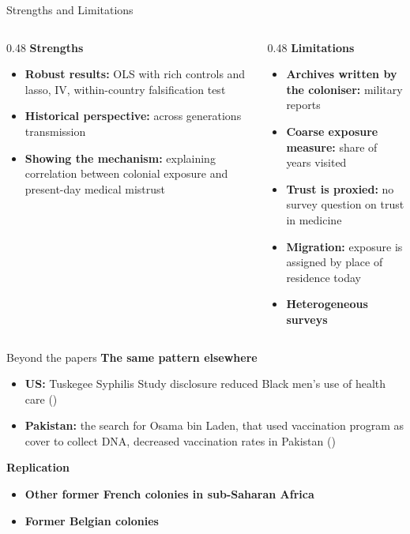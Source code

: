 \documentclass[aspectratio=1610]{beamer}
\newcommand{\refs}[1]{{\footnotesize\color{softgray}(\citealp{#1})}} %
\begin{document}
\begin{frame}{Strengths and Limitations}
  \begin{columns}[T] 
    \begin{column}{0.48\textwidth}
      \textbf{\large Strengths}
      \vspace{0.2cm}
      \begin{itemize}
        \item \textbf{Robust results:} OLS with rich controls and lasso, IV, within-country falsification test
        \item \textbf{Historical perspective:} across generations transmission
        \item \textbf{Showing the mechanism:} explaining correlation between colonial exposure and present-day medical mistrust
      \end{itemize}
    \end{column}
    
    \begin{column}{0.48\textwidth}
      \textbf{\large Limitations}
      \vspace{0.2cm}
      \begin{itemize}
        \item \textbf{Archives written by the coloniser:} military reports
        \item \textbf{Coarse exposure measure:} share of years visited
        \item \textbf{Trust is proxied:} no survey question on trust in medicine
        \item \textbf{Migration:} exposure is assigned by place of residence today
        \item \textbf{Heterogeneous surveys}
      \end{itemize}
    \end{column}
    
  \end{columns}
\end{frame}

\begin{frame}{Beyond the papers}
  \small
      \textbf{The same pattern elsewhere}
      \begin{itemize}
        \item \textbf{US:} Tuskegee Syphilis Study disclosure reduced Black men's use of health care
          \refs{alsan_wanamaker_2018}
        \item \textbf{Pakistan:} the search for Osama bin Laden, that used vaccination program as cover to collect DNA, decreased vaccination rates in Pakistan \refs{martinez_bravo_stegmann_2022}
      \end{itemize}
       \textbf{Replication}
      \begin{itemize}
        \item \textbf{Other former French colonies in sub-Saharan Africa}
        \item \textbf{Former Belgian colonies}
      \end{itemize}
\end{frame}
\end{document}
